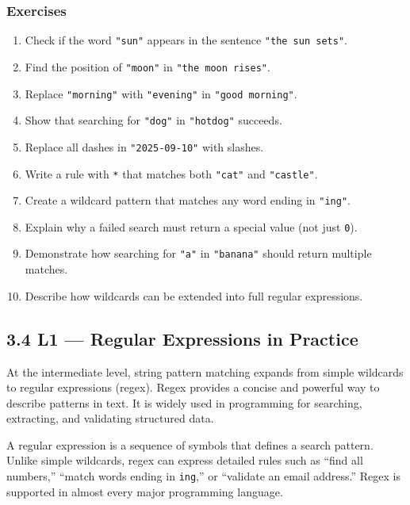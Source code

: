 \documentclass[
  letterpaper,
  DIV=11,
  numbers=noendperiod]{scrreprt}
\providecommand{\tightlist}{%
  \setlength{\itemsep}{0pt}\setlength{\parskip}{0pt}}
\begin{document}
\subsubsection{Exercises}\label{exercises-38}

\begin{enumerate}
\def\labelenumi{\arabic{enumi}.}
\tightlist
\item
  Check if the word \texttt{"sun"} appears in the sentence
  \texttt{"the\ sun\ sets"}.
\item
  Find the position of \texttt{"moon"} in \texttt{"the\ moon\ rises"}.
\item
  Replace \texttt{"morning"} with \texttt{"evening"} in
  \texttt{"good\ morning"}.
\item
  Show that searching for \texttt{"dog"} in \texttt{"hotdog"} succeeds.
\item
  Replace all dashes in \texttt{"2025-09-10"} with slashes.
\item
  Write a rule with \texttt{*} that matches both \texttt{"cat"} and
  \texttt{"castle"}.
\item
  Create a wildcard pattern that matches any word ending in
  \texttt{"ing"}.
\item
  Explain why a failed search must return a special value (not just
  \texttt{0}).
\item
  Demonstrate how searching for \texttt{"a"} in \texttt{"banana"} should
  return multiple matches.
\item
  Describe how wildcards can be extended into full regular expressions.
\end{enumerate}

\subsection{3.4 L1 --- Regular Expressions in
Practice}\label{l1-regular-expressions-in-practice}

At the intermediate level, string pattern matching expands from simple
wildcards to regular expressions (regex). Regex provides a concise and
powerful way to describe patterns in text. It is widely used in
programming for searching, extracting, and validating structured data.

A regular expression is a sequence of symbols that defines a search
pattern. Unlike simple wildcards, regex can express detailed rules such
as ``find all numbers,'' ``match words ending in \texttt{ing},'' or
``validate an email address.'' Regex is supported in almost every major
programming language.
\end{document}
